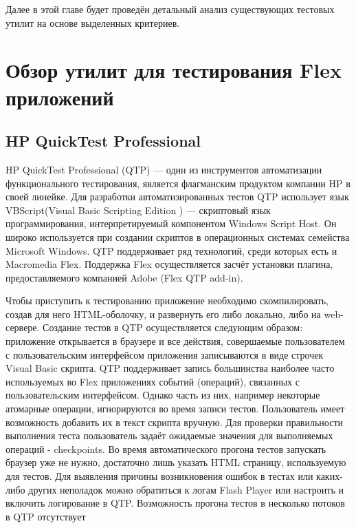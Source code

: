 Далее в этой главе будет проведён детальный анализ существующих тестовых 
утилит на основе выделенных критериев. 

\section*{Обзор утилит для тестирования Flex приложений}

\subsection*{HP QuickTest Professional}

HP QuickTest Professional (QTP) — один из инструментов автоматизации 
функционального тестирования, является флагманским продуктом компании 
HP в своей линейке. Для разработки автоматизированных тестов QTP 
использует язык VBScript(Visual Basic Scripting Edition ) — скриптовый 
язык программирования, интерпретируемый компонентом Windows Script Host.
Он широко используется при создании скриптов в операционных системах
семейства Microsoft Windows. QTP поддерживает ряд технологий, среди
которых есть и Macromedia Flex. Поддержка Flex осуществляется засчёт
установки плагина, предоставляемого компанией Adobe (Flex QTP add-in).

Чтобы приступить к тестированию приложение необходимо скомпилировать, 
создав для него HTML-оболочку, и развернуть его либо локально, либо на 
web-сервере. Создание тестов в QTP осуществляется следующим образом:
приложение открывается в браузере и все действия, совершаемые пользователем с 
пользовательским интерфейсом приложения записываются в виде строчек Visual Basic скрипта. 
QTP поддерживает запись большинства наиболее часто используемых во Flex 
приложениях событий (операций), связанных с пользовательским интерфейсом. 
Однако часть из них, например некоторые атомарные операции, игнорируются 
во время записи тестов. Пользователь имеет возможность добавить их в 
текст скрипта вручную. Для проверки правильности выполнения теста 
пользователь задаёт ожидаемые значения для выполняемых операций - 
checkpoints. Во время автоматического прогона тестов запускать браузер 
уже не нужно, достаточно лишь указать HTML страницу, используемую для 
тестов. Для выявления причины возникновения ошибок в тестах или каких-либо 
других неполадок можно обратиться к логам Flash Player или настроить и 
включить логирование в QTP. Возможность прогона тестов в несколько потоков
в QTP отсутствует

